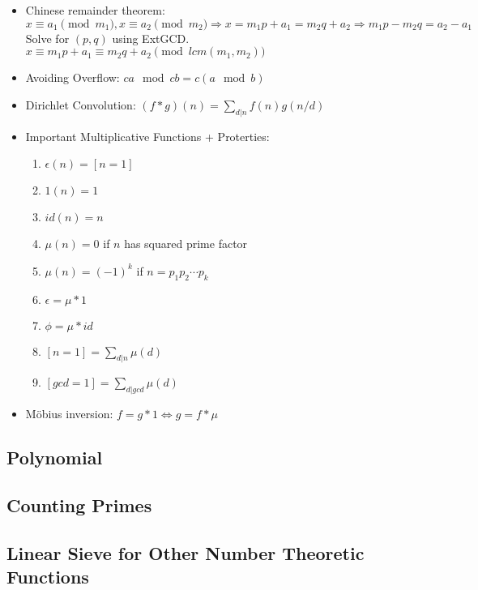 \documentclass[a4paper,10pt,twocolumn,oneside]{article}
\begin{document}
{\begin{itemize}
    \item Chinese remainder theorem:\\
    $x \equiv a_1 \pmod{m_1}, x \equiv a_2 \pmod{m_2} \Rightarrow x = m_1 p + a_1 = m_2 q + a_2 \Rightarrow m_1 p - m_2 q = a_2 - a_1$\\
    Solve for $(p, q)$ using ExtGCD.\\
    $x \equiv m_1 p + a_1 \equiv m_2 q + a_2 \pmod{lcm(m_1, m_2)}$
    
    \item Avoiding Overflow:
    $ca \mod cb = c(a \mod b)$
    
    \item Dirichlet Convolution: $(f * g)(n) = \sum_{d|n} f(n)g(n/d)$
    
    \item Important Multiplicative Functions + Proterties:
    \begin{enumerate}[nolistsep]
        \item $\epsilon(n) = [n = 1]$
        \item $1(n) = 1$
        \item $id(n) = n$
        \item $\mu(n) = 0$ if $n$ has squared prime factor
        \item $\mu(n) = (-1)^k$ if $n = p_1 p_2 \cdots p_k$
        \item $\epsilon = \mu * 1$
        \item $\phi = \mu * id$
        \item $[n=1] = \sum_{d|n} \mu(d)$
        \item $[gcd=1] = \sum_{d|gcd} \mu(d)$
    \end{enumerate}
    
    \item Möbius inversion:
    $f = g * 1 \Leftrightarrow g = f * \mu$
\end{itemize}}

\subsection{Polynomial}


\subsection{Counting Primes}


\subsection{Linear Sieve for Other Number Theoretic Functions}

\end{document}
